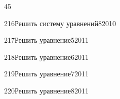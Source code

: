 \begin{TrigSourcePage}{45}
\begin{TrigExercise}{216}{Решить систему уравнений}{8}{2010}
\end{TrigExercise}
\begin{TrigExercise}{217}{Решить уравнение}{5}{2011}
\end{TrigExercise}
\begin{TrigExercise}{218}{Решить уравнение}{6}{2011}
\end{TrigExercise}
\begin{TrigExercise}{219}{Решить уравнение}{7}{2011}
\end{TrigExercise}
\begin{TrigExercise}{220}{Решить уравнение}{8}{2011}
\end{TrigExercise}
\end{TrigSourcePage}

